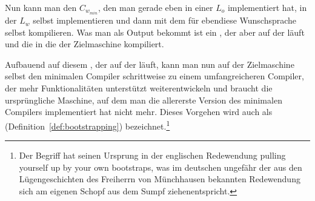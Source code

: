 Nun kann man den  $C_{w_{min}}$, den man gerade eben in einer  $L_o$ implementiert hat, in der  $L_w$ selbst implementieren und dann mit dem  für ebendiese Wunschsprache selbst kompilieren. Was man als Output bekommt ist ein , der aber auf der  läuft und die  in die  der Zielmaschine kompiliert.

Aufbauend auf diesem , der auf der  läuft, kann man nun auf der Zielmaschine selbst  den minimalen Compiler schrittweise zu einem umfangreicheren Compiler, der mehr Funktionalitäten unterstützt weiterentwickeln und braucht die ursprüngliche Maschine, auf dem man die allererste Version des minimalen Compilers implementiert hat nicht mehr. Dieses Vorgehen wird auch als  (Definition~\ref{def:bootstrapping}) bezeichnet.\footnote{Der Begriff hat seinen Ursprung in der englischen Redewendung \glqq pulling yourself up by your own bootstraps\grqq, was im deutschen ungefähr der aus den Lügengeschichten des Freiherrn von Münchhausen bekannten Redewendung \glqq sich am eigenen Schopf aus dem Sumpf ziehen\grqq entspricht.}

